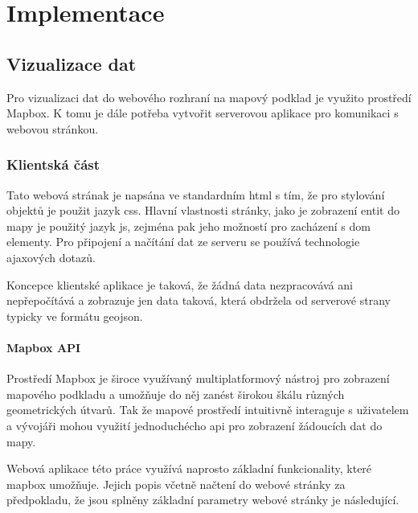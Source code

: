 
\chapter{Implementace}


\section{Vizualizace dat}

Pro vizualizaci dat do webového rozhraní na mapový podklad je využito prostředí Mapbox. K tomu je dále potřeba vytvořit serverovou aplikace pro komunikaci s webovou stránkou.

\subsection{Klientská část}

Tato webová strának je napsána ve standardním \gls{html} s tím, že pro stylování objektů je použit jazyk \gls{css}. Hlavní vlastnosti stránky, jako je zobrazení entit do mapy je použitý jazyk \gls{js}, zejména pak jeho možností pro zacházení s \gls{dom} elementy. Pro připojení a načítání dat ze serveru se používá technologie \gls{ajax}ových dotazů.

\bigbreak

Koncepce klientské aplikace je taková, že žádná data nezpracovává ani nepřepočítává a zobrazuje jen data taková, která obdržela od serverové strany typicky ve formátu \gls{geojson}.

\subsubsection{Mapbox API}

Prostředí Mapbox je široce využívaný multiplatformový nástroj pro zobrazení mapového podkladu a umožňuje do něj zanést širokou škálu různých geometrických útvarů. Tak že mapové prostředí intuitivně interaguje s uživatelem a vývojáři mohou využití jednoduchécho \gls{api} pro zobrazení žádoucích dat do mapy.

\bigbreak

Webová aplikace této práce využívá naprosto základní funkcionality, které mapbox umožňuje. Jejich popis včetně načtení do webové stránky za předpokladu, že jsou splněny základní parametry webové stránky je následující.

